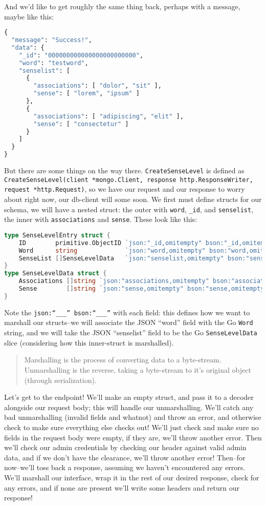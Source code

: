 \documentclass[11pt, twoside, reqno]{book}
\begin{document}
And we'd like to get roughly the same thing back, perhaps with a message, maybe like this:
\begin{lstlisting}[language=Python]
{
  "message": "Success!",
  "data": {
    "_id": "000000000000000000000000",
    "word": "testword",
    "senselist": [
      {
        "associations": [ "dolor", "sit" ],
        "sense": [ "lorem", "ipsum" ]
      },
      {
        "associations": [ "adipiscing", "elit" ],
        "sense": [ "consectetur" ]
      }
    ]
  }
}
\end{lstlisting}

But there are some things on the way there. \texttt{CreateSenseLevel} is defined as \texttt{CreateSenseLevel(client *mongo.Client, response http.ResponseWriter, request *http.Request)}, so we have our request and our response to worry about right now, our db-client will some soon. We first must define structs for our schema, we will have a nested struct: the outer with \texttt{word}, \texttt{\_id}, and \texttt{senselist}, the inner with \texttt{associations} and \texttt{sense}. These look like this:

\begin{lstlisting}[language=Go]
type SenseLevelEntry struct {
	ID        primitive.ObjectID `json:"_id,omitempty" bson:"_id,omitempty"`
	Word      string             `json:"word,omitempty" bson:"word,omitempty"`
	SenseList []SenseLevelData   `json:"senselist,omitempty" bson:"senselist,omitempty"`
}
type SenseLevelData struct {
	Associations []string `json:"associations,omitempty" bson:"associations,omitempty"`
	Sense        []string `json:"sense,omitempty" bson:"sense,omitempty"`
}
\end{lstlisting}

Note the \texttt{json:``\_\_\_'' bson:``\_\_\_''} with each field: this defines how we want to marshall our structs--we will associate the JSON ``word'' field with the Go \texttt{Word} string, and we will take the JSON ``senselist'' field to be the Go \texttt{SenseLevelData} slice (considering how this inner-struct is marshalled).

\begin{quote}
Marshalling is the process of converting data to a byte-stream. Unmarshalling is the reverse, taking a byte-stream to it's original object (through serialization).
\end{quote}

Let's get to the endpoint! We'll make an empty struct, and pass it to a decoder alongside our request body; this will handle our unmarshalling. We'll catch any bad unmarshalling (invalid fields and whatnot) and throw an error, and otherwise check to make sure everything else checks out! We'll just check and make sure no fields in the request body were empty, if they are, we'll throw another error. Then we'll check our admin credentials by checking our header against valid admin data, and if we don't have the clearance, we'll throw another error! Then--for now--we'll toss back a response, assuming we haven't encountered any errors. We'll marshall our interface, wrap it in the rest of our desired response, check for any errors, and if none are present we'll write some headers and return our response!
\end{document}
